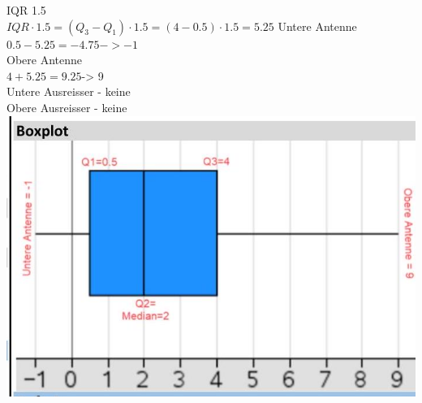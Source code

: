 \documentclass[10pt]{article}
\begin{document}
{IQR 1.5\\
$I Q R \cdot 1.5=\left(Q_{3}-Q_{1}\right) \cdot 1.5=(4-0.5) \cdot 1.5=5.25$ Untere Antenne\\
$0.5-5.25=-4.75->-1$\\
Obere Antenne\\
$4+5.25=9.25$-> 9\\
Untere Ausreisser - keine\\
Obere Ausreisser - keine\\
\includegraphics[width=\linewidth]{images/2024_12_29_0906b02acf849bda8665g-5(16)}

}
\end{document}
